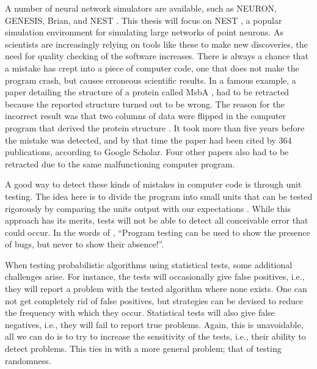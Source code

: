 A number of neural network simulators are available, such as NEURON, GENESIS, Brian, and NEST . This thesis will focus on NEST , a popular simulation environment for simulating large networks of point neurons.
As scientists are increasingly relying on tools like these to make new discoveries, the need for quality checking of the software increases. There is always a chance that a mistake has crept into a piece of computer code, one that does not make the program crash, but causes erroneous scientific results. In a famous example, a paper detailing the structure of a protein called MsbA , had to be retracted because the reported structure turned out to be wrong. The reason for the incorrect result was that two columns of data were flipped in the computer program that derived the protein structure . It took more than five years before the mistake was detected, and by that time the paper had been cited by 364 publications, according to Google Scholar. Four other papers also had to be retracted due to the same malfunctioning computer program. 


A good way to detect these kinds of mistakes in computer code is through unit testing. The idea here is to divide the program into small units that can be tested rigorously by comparing the units output with our expectations \cite{huizinga2007automated}. While this approach has its merits, tests will not be able to detect all conceivable error that could occur. In the words of , ``Program testing can be used to show the presence of bugs, but never to show their absence!''.


When testing probabilistic algorithms using statistical tests, some additional challenges arise. For instance, the tests will occasionally give false positives, i.e., they will report a problem with the tested algorithm where none exists. One can not get completely rid of false positives, but strategies can be devised to reduce the frequency with which they occur. Statistical tests will also give false negatives, i.e., they will fail to report true problems. Again, this is unavoidable, all we can do is to try to increase the sensitivity of the tests, i.e., their ability to detect problems. This ties in with a more general problem; that of testing randomness. 

